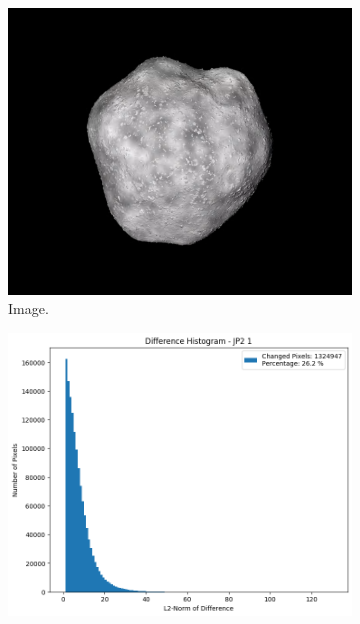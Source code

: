 \begin{figure}[htb]
    \centering
    \begin{subfigure}[b]{0.48\textwidth}
        \centering
        \includegraphics[width=\textwidth]{doc/thesis/0_figures/compare_quality/set1/jp2_1.png}
        \caption{Image.}
        \label{fig:img_quality_comp_jp2_1_orig}
    \end{subfigure}
    \begin{subfigure}[b]{0.48\textwidth}
        \centering
        \includegraphics[width=\textwidth]{doc/thesis/0_figures/compare_quality/set1/jp2_1_diff_histogram.png}

\end{subfigure}
\end{figure}

